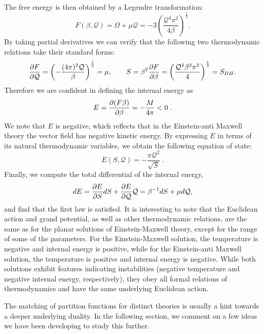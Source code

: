 The free energy is then obtained by a Legendre transformation:
\begin{equation*}
    F(\beta, \mathcal{Q}) = \Omega + \mu \mathcal{Q} =
    - 3 \left( \frac{\mathcal{Q}^4 \pi^2}{4 \beta} \right)^{\frac{1}{3}}.
\end{equation*}
By taking partial derivatives we can verify that the following two thermodynamic
relations take their standard forms:
\begin{equation*}
    \frac{\partial F}{\partial \mathcal{Q}} = \left(- \frac{(4\pi)^2 \mathcal{Q}}{\beta} \right)^{\frac{1}{3}} = \mu, \qquad     S = \beta^2 \frac{\partial F}{\partial \beta} = \left(\frac{\mathcal{Q}^4 \beta^2 \pi^2}{4} \right)^{\frac{1}{3}} = S_{BH}.
\end{equation*}
Therefore we are confident in defining the internal energy as
\begin{equation*}
    E = \frac{\partial (F \beta)}{\partial \beta}  = -\frac{M}{4 \pi} <0 \;.
\end{equation*}
We note that $E$ is negative, which reflects that in the Einstein-anti Maxwell theory the
vector field has negative kinetic energy. 
By expressing $E$ in terms of its natural thermodynamic variables, we obtain 
the following equation of state:
\begin{equation*}
    E(S, \mathcal{Q}) = - \frac{\pi \mathcal{Q}^2}{\sqrt{S}} \;.
\end{equation*}
Finally, we compute the total differential of the internal energy, 
\begin{equation*}
    dE = \frac{\partial E}{\partial S} dS + \frac{\partial E}{\partial \mathcal{Q}} \mathcal{Q} = \beta^{-1} dS + \mu d\mathcal{Q},
\end{equation*}
and find that the first law is satisfied. It is interesting to note that the Euclidean action and grand potential, as well as other thermodynamic relations, are the same as for the planar solutions of Einstein-Maxwell theory, except for the range of some of the parameters. For the Einstein-Maxwell solution, the temperature is negative and internal energy is positive, while for the Einstein-anti Maxwell solution, the temperature is positive and internal energy is negative. While both solutions exhibit features indicating instabilities (negative temperature and negative internal energy, respectively), they obey all formal relations of thermodynamics and have the same underlying Euclidean action. 

The matching of partition functions for distinct theories is usually a hint towards a deeper underlying duality. In the following section, we comment on a few ideas we have been developing to study this further.

